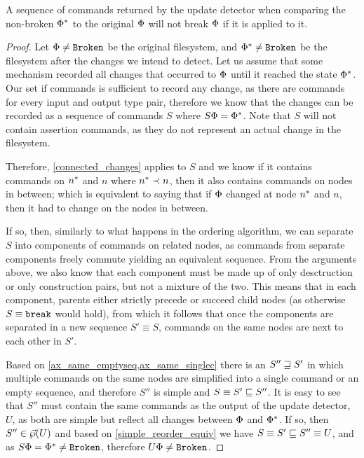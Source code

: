 \documentclass[12pt]{article}
\begin{document}
\begin{myth}\label{update_works}
A sequence of commands returned by the update detector
when comparing the non-broken $\Phi^*$ to the original $\Phi$
will not break $\Phi$ if it is applied to it.
\end{myth}
\begin{proof}
Let $\Phi\neq\mathtt{Broken}$ be the original filesystem, and $\Phi^*\neq\mathtt{Broken}$
be the filesystem after the changes we intend to detect.
Let us assume that some mechanism recorded all changes that occurred
to $\Phi$ until it reached the state $\Phi^*$.
Our set if commands is sufficient to record any change, as
there are commands for every input and output type pair, therefore
we know that the changes can be recorded as a sequence of commands $S$
where $S\Phi=\Phi^*$.
Note that $S$ will not contain assertion commands, as they do not
represent an actual change in the filesystem.

Therefore, \cref{connected_changes} applies to $S$ and we know
if it contains commands on $n^*$ and $n$ where $n^*\prec n$,
then it also contains commands on nodes in between;
which is equivalent to saying that if $\Phi$ changed
at node $n^*$ and $n$, then it had to change on the nodes in between.

If so, then, similarly to what happens in the ordering algorithm,
we can separate $S$ into components of commands on related nodes,
as commands from separate components freely commute yielding an equivalent sequence.
From the arguments above, we also know that each component
must be made up of only desctruction or only construction pairs,
but not a mixture of the two.
This means that in each component, parents either strictly precede or succeed child nodes
(as otherwise $S\equiv\mathtt{break}$ would hold),
from which it follows that once the components are separated
in a new sequence $S'\equiv S$,
commands on the same nodes are next to each other in $S'$.

Based on \cref{ax_same_emptyseq,ax_same_singlec} there is
an $S''\sqsupseteq S'$ in which multiple commands on the same nodes
are simplified into a single command or an empty sequence,
and therefore $S''$ is simple and $S\equiv S'\sqsubseteq S''$.
It is easy to see that $S''$ must contain the same commands
as the output of the update detector, $U$, as both are simple
but reflect all changes between $\Phi$ and $\Phi^*$.
If so, then $S''\in\vec{\wp}({U})$ and based on \cref{simple_reorder_equiv}
we have
$S\equiv S'\sqsubseteq S''\equiv U$, and as $S\Phi = \Phi^* \neq \mathtt{Broken}$,
therefore $U\Phi\neq\mathtt{Broken}$.
\end{proof}
\end{document}
